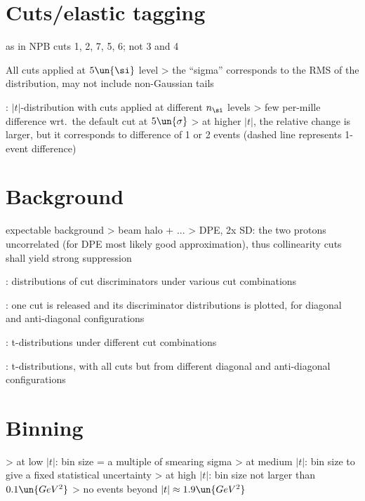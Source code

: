 \section{Cuts/elastic tagging}

\> as in NPB
\> cuts 1, 2, 7, 5, 6; not 3 and 4

\> All cuts applied at $5\un{\si}$ level
\>> the ``sigma'' corresponds to the RMS of the distribution, may not include non-Gaussian tails

\>  : $|t|$-distribution with cuts applied at different $n_\si$ levels
\>> few per-mille difference wrt.~the default cut at $5\un{\sigma}$
\>> at higher $|t|$, the relative change is larger, but it corresponds to difference of 1 or 2 events (dashed line represents 1-event difference)


\section{Background}

\> expectable background
\>> beam halo + ...
\>> DPE, 2x SD: the two protons uncorrelated (for DPE most likely good approximation), thus collinearity cuts
shall yield strong suppression


\> : distributions of cut discriminators under various cut combinations

\> : one cut is released and its discriminator distributions is plotted, for diagonal and anti-diagonal configurations

\> : t-distributions under different cut combinations

\> : t-distributions, with all cuts but from different diagonal and anti-diagonal configurations


\section{Binning}

\> 
\>> at low $|t|$: bin size = a multiple of smearing sigma
\>> at medium $|t|$: bin size to give a fixed statistical uncertainty
\>> at high $|t|$: bin size not larger than $0.1\un{GeV^2}$
\>> no events beyond $|t| \approx 1.9\un{GeV^2}$

